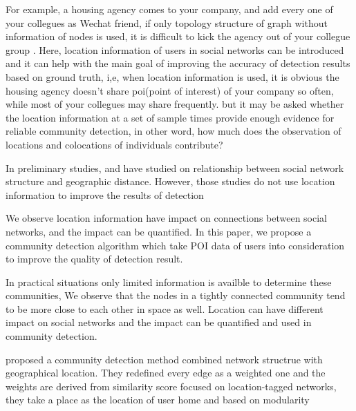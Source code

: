 For example, a housing agency comes to your company, and add every one of your collegues as Wechat friend, 
if  only topology structure of graph without information of nodes is used, it is difficult to kick the agency out of your collegue group .
Here, location information of users in social networks can be introduced 
and it can help with the main goal of improving the accuracy of detection results based on ground truth, 
i,e, when location information is used,
it is obvious the housing agency doesn't share poi(point of interest) of your company so often, 
while most of your collegues may share frequently.
but it may be asked whether the location information at a set of sample times 
provide enough evidence for reliable community detection,
in other word, 
how much does the observation of locations and colocations of individuals contribute?

In preliminary studies, 
\cite{} and \cite{} have studied on relationship between social network structure and geographic distance.
However, those studies do not use location information to improve the results of detection

We observe location information have impact on connections between social networks,
and the impact can be quantified. In this paper,
we propose a community detection algorithm which take POI data of users into consideration
to improve the quality of detection result.




In practical situations only limited information is availble to determine these communities,
We observe that the nodes in a tightly connected community tend to be more close to each other in
space as well.
Location can have different impact on social networks and the impact can be quantified and used 
in community detection.





\cite{} proposed a community detection method combined network structrue with geographical location.
They redefined every edge as a weighted one and the weights are derived from similarity score 
focused on location-tagged networks, 
they take a place as the location of user home
and based on modularity 










